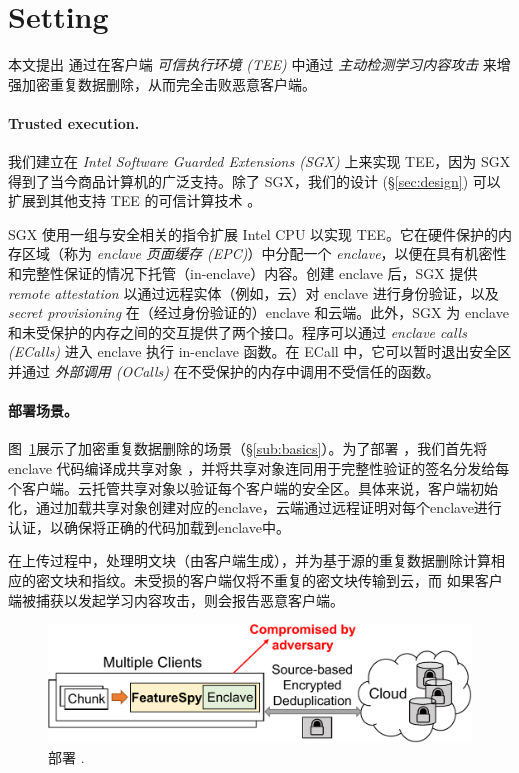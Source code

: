 \section{Setting}
\label{sec:setting}
本文提出 \sysnameF 通过在客户端 {\em 可信执行环境 (TEE)} 中通过 {\em 主动检测学习内容攻击} 来增强加密重复数据删除，从而完全击败恶意客户端。

\paragraph{Trusted execution.} 我们建立在 {\em Intel Software Guarded Extensions (SGX)} \cite{sgx} 上来实现 TEE，因为 SGX 得到了当今商品计算机的广泛支持。除了 SGX，我们的设计 (\S\ref{sec:design}) 可以扩展到其他支持 TEE 的可信计算技术 \cite{amd-sev, pinto19}。

SGX 使用一组与安全相关的指令扩展 Intel CPU 以实现 TEE。它在硬件保护的内存区域（称为 {\em enclave 页面缓存 (EPC)}）中分配一个 {\em enclave}，以便在具有机密性和完整性保证的情况下托管（in-enclave）内容。创建 enclave 后，SGX 提供 {\em remote attestation} 以通过远程实体（例如，云）对 enclave 进行身份验证，以及 {\em secret provisioning} 在（经过身份验证的）enclave 和云端。此外，SGX 为 enclave 和未受保护的内存之间的交互提供了两个接口。程序可以通过 {\em enclave calls (ECalls)} 进入 enclave 执行 in-enclave 函数。在 ECall 中，它可以暂时退出安全区并通过 {\em 外部调用 (OCalls)} 在不受保护的内存中调用不受信任的函数。



\paragraph{部署场景。}图~\ref{fig:model}展示了加密重复数据删除的场景（\S\ref{sub:basics}）。为了部署 \sysnameF，我们首先将 enclave 代码编译成共享对象 \cite{sgx}，并将共享对象连同用于完整性验证的签名分发给每个客户端。云托管共享对象以验证每个客户端的安全区。具体来说，客户端初始化\sysnameF，通过加载共享对象创建对应的enclave，云端通过远程证明\cite{sgx}对每个enclave进行认证，以确保将正确的代码加载到enclave中。

在上传过程中，\sysnameF 处理明文块（由客户端生成），并为基于源的重复数据删除计算相应的密文块和指纹。未受损的客户端仅将不重复的密文块传输到云，而 \sysnameF 如果客户端被捕获以发起学习内容攻击，则会报告恶意客户端。

\begin{figure}
  \centering
  \includegraphics[width=\textwidth]{pic/featurespy/deployment.pdf}
  \vspace{-6pt}
  \caption{部署 \sysnameF.}
  \label{fig:model}
  \vspace{-6pt}
\end{figure}

